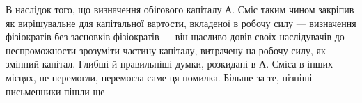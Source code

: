В наслідок того, що визначення обігового капіталу А. Сміс таким
чином закріпив як вирішувальне для капітальної вартости, вкладеної в робочу
силу — визначення фізіократів без засновків фізіократів — він щасливо
довів своїх наслідувачів до неспроможности зрозуміти частину капіталу,
витрачену на робочу силу, як змінний капітал. Глибші й правильніші
думки, розкидані в А. Сміса в інших місцях, не перемогли, перемогла
саме ця помилка. Більше за те, пізніші письменники пішли ще
\parbreak{}  %
